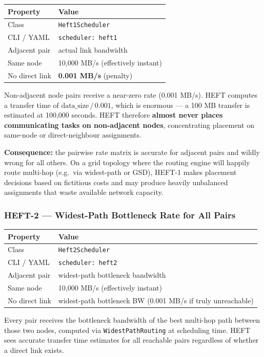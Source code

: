 \documentclass[11pt]{article}
\begin{document}
\begin{tabular}{@{}ll@{}}
\toprule
\textbf{Property} & \textbf{Value} \\
\midrule
Class         & \texttt{Heft1Scheduler} \\
CLI / YAML    & \texttt{scheduler: heft1} \\
Adjacent pair & actual link bandwidth \\
Same node     & 10{,}000 MB/s (effectively instant) \\
No direct link & \textbf{0.001 MB/s} (penalty) \\
\bottomrule
\end{tabular}

\medskip
Non-adjacent node pairs receive a near-zero rate (0.001 MB/s).  HEFT computes
a transfer time of $\text{data\_size}\,/\,0.001$, which is enormous --- a
100 MB transfer is estimated at 100{,}000 seconds.  HEFT therefore
\textbf{almost never places communicating tasks on non-adjacent nodes},
concentrating placement on same-node or direct-neighbour assignments.

\medskip
\textbf{Consequence:} the pairwise rate matrix is accurate for adjacent pairs
and wildly wrong for all others.  On a grid topology where the routing engine
will happily route multi-hop (e.g.\ via widest-path or GSD), HEFT-1 makes
placement decisions based on fictitious costs and may produce
heavily unbalanced assignments that waste available network capacity.

\subsubsection{HEFT-2 --- Widest-Path Bottleneck Rate for All Pairs}

\begin{tabular}{@{}ll@{}}
\toprule
\textbf{Property} & \textbf{Value} \\
\midrule
Class         & \texttt{Heft2Scheduler} \\
CLI / YAML    & \texttt{scheduler: heft2} \\
Adjacent pair & widest-path bottleneck bandwidth \\
Same node     & 10{,}000 MB/s (effectively instant) \\
No direct link & widest-path bottleneck BW (0.001 MB/s if truly unreachable) \\
\bottomrule
\end{tabular}

\medskip
Every pair receives the bottleneck bandwidth of the best multi-hop path
between those two nodes, computed via \texttt{WidestPathRouting} at scheduling
time.  HEFT sees accurate transfer time estimates for all reachable pairs
regardless of whether a direct link exists.
\end{document}
